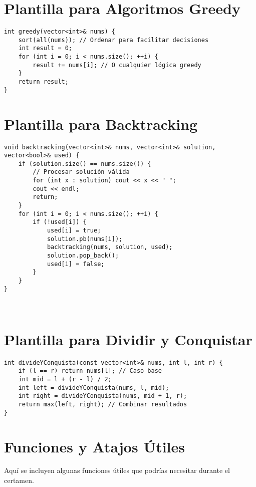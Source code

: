 \section{Plantilla para Algoritmos Greedy}

\begin{lstlisting}[style=cpp]
int greedy(vector<int>& nums) {
    sort(all(nums)); // Ordenar para facilitar decisiones
    int result = 0;
    for (int i = 0; i < nums.size(); ++i) {
        result += nums[i]; // O cualquier lógica greedy
    }
    return result;
}
\end{lstlisting}
\newpage
\section{Plantilla para Backtracking}

\begin{lstlisting}[style=cpp]
void backtracking(vector<int>& nums, vector<int>& solution, vector<bool>& used) {
    if (solution.size() == nums.size()) {
        // Procesar solución válida
        for (int x : solution) cout << x << " ";
        cout << endl;
        return;
    }
    for (int i = 0; i < nums.size(); ++i) {
        if (!used[i]) {
            used[i] = true;
            solution.pb(nums[i]);
            backtracking(nums, solution, used);
            solution.pop_back();
            used[i] = false;
        }
    }
}



\end{lstlisting}

\section{Plantilla para Dividir y Conquistar}

\begin{lstlisting}[style=cpp]
int divideYConquista(const vector<int>& nums, int l, int r) {
    if (l == r) return nums[l]; // Caso base
    int mid = l + (r - l) / 2;
    int left = divideYConquista(nums, l, mid);
    int right = divideYConquista(nums, mid + 1, r);
    return max(left, right); // Combinar resultados
}
\end{lstlisting}

\section{Funciones y Atajos Útiles}

Aquí se incluyen algunas funciones útiles que podrías necesitar durante el certamen.

